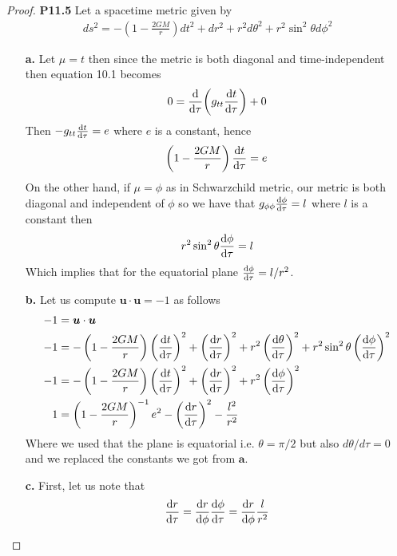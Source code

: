 \documentclass[11pt]{article}
\theoremstyle{definition}
\begin{document}
\begin{proof}{\textbf{P11.5}}
Let a spacetime metric given by
\begin{align*}
    ds^2 = -\left(1 - \frac{2GM}{r}\right)dt^2 + dr^2 + r^2d\theta^2
    + r^2\sin^2\theta d\phi^2
\end{align*}
\begin{itemize}
    \item [\textbf{a.}] Let $\mu = t$ then since the metric is both diagonal
    and time-independent then equation 10.1 becomes
    \begin{align*}
        0 = \dv{\tau}(g_{tt}\dv{t}{\tau}) + 0
    \end{align*}
    Then $-g_{tt}\dv{t}{\tau} = e$ where $e$ is a constant, hence
    \begin{align*}
        \left(1 - \frac{2GM}{r}\right)\dv{t}{\tau} = e
    \end{align*}
    On the other hand, if $\mu = \phi$ as in Schwarzchild metric, our metric is
    both diagonal and independent of $\phi$ so we have that
    $g_{\phi\phi}\dv{\phi}{\tau} = l$ where $l$ is a constant then
    \begin{align*}
        r^2\sin^2\theta\dv{\phi}{\tau} = l
    \end{align*}
    Which implies that for the equatorial plane $\dv{\phi}{\tau} = l/r^2$.
    \item [\textbf{b.}] Let us compute $\bm{u}\cdot\bm{u} = -1$ as follows
    \begin{align*}
        -1 &= \bm{u}\cdot\bm{u}\\
        -1 &= -\left(1 - \frac{2GM}{r}\right)\left(\dv{t}{\tau}\right)^2
        + \left(\dv{r}{\tau}\right)^2
        + r^2\left(\dv{\theta}{\tau}\right)^2
        + r^2\sin^2\theta \left(\dv{\phi}{\tau}\right)^2\\
        -1 &= -\left(1 - \frac{2GM}{r}\right)\left(\dv{t}{\tau}\right)^2
        + \left(\dv{r}{\tau}\right)^2
        + r^2 \left(\dv{\phi}{\tau}\right)^2\\
        1 &= \left(1 - \frac{2GM}{r}\right)^{-1}e^2
        - \left(\dv{r}{\tau}\right)^2
        - \frac{l^2}{r^2}
    \end{align*}
    Where we used that the plane is equatorial i.e. $\theta = \pi/2$ but also
    $d\theta/d\tau = 0$ and we replaced the constants we got from $\textbf{a.}$
    \item [\textbf{c.}] First, let us note that
    \begin{align*}
        \dv{r}{\tau} = \dv{r}{\phi}\dv{\phi}{\tau} = \dv{r}{\phi}\frac{l}{r^2}

\end{align*}
\end{itemize}
\end{proof}
\end{document}

